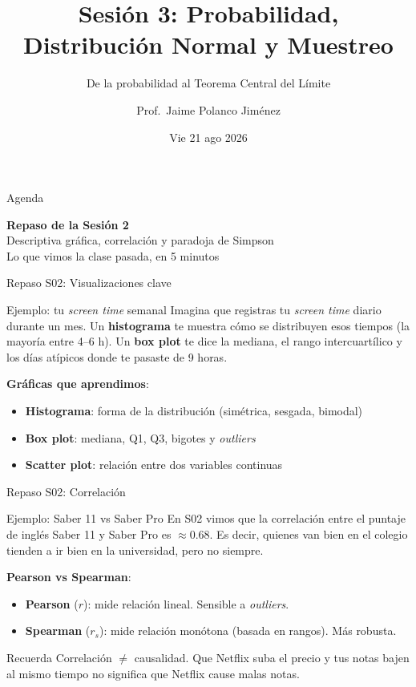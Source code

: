 \documentclass[aspectratio=169, 11pt]{beamer}
\title{Sesión 3: Probabilidad, Distribución Normal y Muestreo}
\subtitle{De la probabilidad al Teorema Central del Límite}
\author{Prof.\ Jaime Polanco Jim\'enez}
\date{Vie 21 ago 2026}
\begin{document}
\begin{frame}
\titlepage
\end{frame}

\begin{frame}{Agenda}
\tableofcontents
\end{frame}

\begin{frame}{}
\vfill
\centering
{\Large\textbf{Repaso de la Sesi\'on 2}}\\[1em]
{\normalsize Descriptiva gr\'afica, correlaci\'on y paradoja de Simpson}\\[0.5em]
{\small Lo que vimos la clase pasada, en 5 minutos}
\vfill
\end{frame}

\begin{frame}{Repaso S02: Visualizaciones clave}
\small
\begin{exampleblock}{Ejemplo: tu \emph{screen time} semanal}
Imagina que registras tu \emph{screen time} diario durante un mes. Un \textbf{histograma} te muestra c\'omo se distribuyen esos tiempos (la mayor\'ia entre 4--6 h). Un \textbf{box plot} te dice la mediana, el rango intercuart\'ilico y los d\'ias at\'ipicos donde te pasaste de 9 horas.
\end{exampleblock}

\textbf{Gr\'aficas que aprendimos}:
\begin{itemize}\setlength{\itemsep}{1pt}
  \item \textbf{Histograma}: forma de la distribuci\'on (sim\'etrica, sesgada, bimodal)
  \item \textbf{Box plot}: mediana, Q1, Q3, bigotes y \emph{outliers}
  \item \textbf{Scatter plot}: relaci\'on entre dos variables continuas
\end{itemize}
\end{frame}

\begin{frame}{Repaso S02: Correlaci\'on}
\small
\begin{exampleblock}{Ejemplo: Saber 11 vs Saber Pro}
En S02 vimos que la correlaci\'on entre el puntaje de ingl\'es Saber 11 y Saber Pro es $\approx 0.68$. Es decir, quienes van bien en el colegio tienden a ir bien en la universidad, pero no siempre.
\end{exampleblock}

\textbf{Pearson vs Spearman}:
\begin{itemize}\setlength{\itemsep}{1pt}
  \item \textbf{Pearson} ($r$): mide relaci\'on \alert{lineal}. Sensible a \emph{outliers}.
  \item \textbf{Spearman} ($r_s$): mide relaci\'on \alert{mon\'otona} (basada en rangos). M\'as robusta.
\end{itemize}

\begin{alertblock}{Recuerda}
Correlaci\'on $\neq$ causalidad. Que Netflix suba el precio y tus notas bajen al mismo tiempo no significa que Netflix cause malas notas.
\end{alertblock}
\end{frame}
\end{document}
